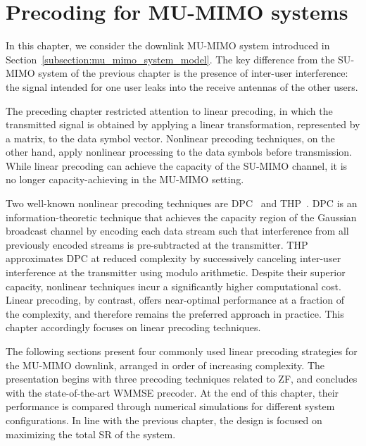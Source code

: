 \chapter{Precoding for MU-MIMO systems}
\label{chapter:mu_mimo_precoding}

In this chapter, we consider the downlink \ac{MU}-\ac{MIMO} system introduced in Section~\ref{subsection:mu_mimo_system_model}.
The key difference from the \ac{SU}-\ac{MIMO} system of the previous chapter is the presence of inter-user interference: the signal intended for one user leaks into the receive antennas of the other users.

The preceding chapter restricted attention to linear precoding, in which the transmitted signal is obtained by applying a linear transformation, represented by a matrix, to the data symbol vector.
Nonlinear precoding techniques, on the other hand, apply nonlinear processing to the data symbols before transmission.
While linear precoding can achieve the capacity of the \ac{SU}-\ac{MIMO} channel, it is no longer capacity-achieving in the \ac{MU}-\ac{MIMO} setting.

Two well-known nonlinear precoding techniques are \acf{DPC}~\cite{dirty_paper_costa} and \acf{THP}~\cite{THP_harashima, THP_MIMO}.
\ac{DPC} is an information-theoretic technique that achieves the capacity region of the Gaussian broadcast channel by encoding each data stream such that interference from all previously encoded streams is pre-subtracted at the transmitter.
\ac{THP} approximates \ac{DPC} at reduced complexity by successively canceling inter-user interference at the transmitter using modulo arithmetic.
Despite their superior capacity, nonlinear techniques incur a significantly higher computational cost.
Linear precoding, by contrast, offers near-optimal performance at a fraction of the complexity, and therefore remains the preferred approach in practice.
This chapter accordingly focuses on linear precoding techniques.

The following sections present four commonly used linear precoding strategies for the \ac{MU}-\ac{MIMO} downlink, arranged in order of increasing complexity.
The presentation begins with three precoding techniques related to \acs{ZF}, and concludes with the state-of-the-art \acs{WMMSE} precoder.
At the end of this chapter, their performance is compared through numerical simulations for different system configurations.
In line with the previous chapter, the design is focused on maximizing the total \acf{SR} of the system.


